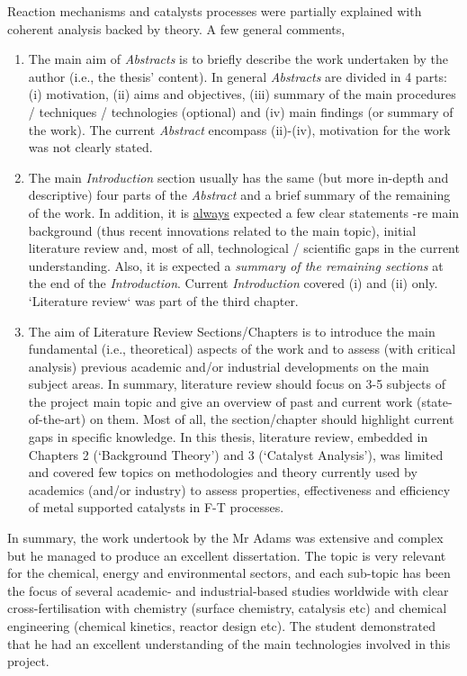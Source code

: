 \documentclass[14pt,twoside]{report}
\begin{document}
Reaction mechanisms and catalysts processes were partially explained with coherent analysis backed by theory. A few general comments,
\begin{enumerate}
%
\item The main aim of {\it Abstracts} is to briefly describe the work undertaken by the author (i.e., the thesis' content). In general {\it Abstracts} are divided in 4 parts: (i) motivation, (ii) aims and objectives, (iii) summary of the main procedures / techniques / technologies (optional) and (iv) main findings (or summary of the work). The current {\it Abstract} encompass (ii)-(iv), motivation for the work was not clearly stated.
%
\item The main {\it Introduction} section usually has the same (but more in-depth and descriptive) four parts of the {\it Abstract} and a brief summary of the remaining of the work. In addition, it is \underline{always} expected a few clear statements -re main background (thus recent innovations related to the main topic), initial literature review and, most of all, technological / scientific gaps in the current understanding. Also, it is expected a {\it summary of the remaining sections} at the end of the {\it Introduction}.  Current {\it Introduction} covered (i) and (ii) only. `Literature review` was part of the third chapter.
%
\item The aim of Literature Review Sections/Chapters is to introduce the main fundamental (i.e., theoretical) aspects of the work and to assess (with critical analysis) previous academic and/or industrial developments on the main subject areas. In summary, literature review should focus on 3-5 subjects of the project main topic and give an overview of past and current work (state-of-the-art) on them. Most of all, the section/chapter should highlight current gaps in specific knowledge. In this thesis, literature review, embedded in Chapters 2 (`Background Theory') and 3 (`Catalyst Analysis'), was limited and covered few topics on methodologies and theory currently used by academics (and/or industry) to assess properties, effectiveness and efficiency of metal supported catalysts in F-T processes.
% 
\end{enumerate}
In summary, the work undertook by the Mr Adams was extensive and complex but he managed to produce an excellent dissertation. The topic is very relevant for the chemical, energy and environmental sectors, and each sub-topic has been the focus of several academic- and industrial-based studies worldwide with clear cross-fertilisation with chemistry (surface chemistry, catalysis etc) and chemical engineering (chemical kinetics, reactor design etc). The student demonstrated that he had an excellent understanding of the main technologies involved in this project.
\end{document}
